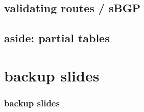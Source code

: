 \subsection{validating routes / sBGP}



\subsection{aside: partial tables}






\section{backup slides}
\begin{frame}\frametitle{backup slides}
\end{frame}


